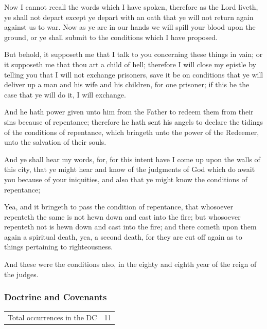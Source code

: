\begin{compactdesc}
			\item[Alma 44:11] Now I cannot recall the words which I have spoken, therefore as the Lord liveth, ye shall not depart except ye depart with an oath that ye will not return again against us to war.  Now as ye are in our hands we will spill your blood upon the ground, or ye shall submit to the conditions which I have proposed.
			\item[Alma 54:11] But behold, it supposeth me that I talk to you concerning these things in vain; or it supposeth me that thou art a child of hell; therefore I will close my epistle by telling you that I will not exchange prisoners, save it be on conditions that ye will deliver up a man and his wife and his children, for one prisoner; if this be the case that ye will do it, I will exchange.
			\item[Helaman 5:11] And he hath power given unto him from the Father to redeem them from their sins because of repentance; therefore he hath sent his angels to declare the tidings of the conditions of repentance, which bringeth unto the power of the Redeemer, unto the salvation of their souls.
			\item[Helaman 14:11] And ye shall hear my words, for, for this intent have I come up upon the walls of this city, that ye might hear and know of the judgments of God which do await you because of your iniquities, and also that ye might know the conditions of repentance;
			\item[Helaman 14:18] Yea, and it bringeth to pass the condition of repentance, that whosoever repenteth the same is not hewn down and cast into the fire; but whosoever repenteth not is hewn down and cast into the fire; and there cometh upon them again a spiritual death, yea, a second death, for they are cut off again as to things pertaining to righteousness.
			\item[Helaman 16:11] And these were the conditions also, in the eighty and eighth year of the reign of the judges.
		\end{compactdesc}
		
	\subsubsection{Doctrine and Covenants} %
		\label{CONDITION-DC}
	
		\begin{tabular}{ll}
			Total occurrences in the DC & 11
		\end{tabular}
		
